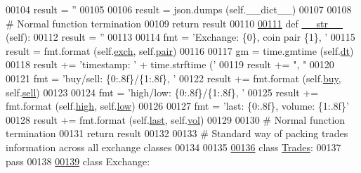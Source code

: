 \begin{DoxyCode}
00104         result = \textcolor{stringliteral}{''}
00105         
00106         result = json.dumps (self.\_\_dict\_\_)       
00107         
00108         \textcolor{comment}{# Normal function termination}
00109         \textcolor{keywordflow}{return} result
00110     
\hypertarget{exchange_8py_source.tex_l00111}{}\hyperlink{classexchange_1_1_ticker_af91836a1c408f54dda95d9865cefba45}{00111}     \textcolor{keyword}{def }\hyperlink{classexchange_1_1_ticker_af91836a1c408f54dda95d9865cefba45}{\_\_str\_\_} (self):
00112         result = \textcolor{stringliteral}{''}
00113         
00114         fmt    = \textcolor{stringliteral}{'Exchange: \{0\}, coin pair \{1\}, '} 
00115         result = fmt.format (self.\hyperlink{classexchange_1_1_ticker_a33f33fe9a12da3ce52938afdc577c061}{exch}, self.\hyperlink{classexchange_1_1_ticker_a382f9199d13a7b5929a26065fad4e491}{pair})
00116         
00117         gm = time.gmtime (self.\hyperlink{classexchange_1_1_ticker_a45e3162d9956cee797f21d93c44c6baf}{dt})
00118         result += \textcolor{stringliteral}{'timestamp: '} + time.strftime (\textcolor{stringliteral}{'%
00119         result += \textcolor{stringliteral}{", "}
00120         
00121         fmt     = \textcolor{stringliteral}{'buy/sell: \{0:.8f\}/\{1:.8f\}, '}
00122         result += fmt.format (self.\hyperlink{classexchange_1_1_ticker_a2ca48c3fa9aba92241392a05bef39324}{buy}, self.\hyperlink{classexchange_1_1_ticker_a5ba9e257d2ed28f02528a37d9ebd793e}{sell})
00123         
00124         fmt     = \textcolor{stringliteral}{'high/low: \{0:.8f\}/\{1:.8f\}, '}
00125         result += fmt.format (self.\hyperlink{classexchange_1_1_ticker_aace381ca15468df6a40e8d86b7710a7f}{high}, self.\hyperlink{classexchange_1_1_ticker_a1c1f26a47a82fc799fcebf158e104405}{low})
00126         
00127         fmt     = \textcolor{stringliteral}{'last: \{0:.8f\}, volume: \{1:.8f\}'}
00128         result += fmt.format (self.\hyperlink{classexchange_1_1_ticker_add7c2d95fa790dcdffddae2e584ce5f5}{last}, self.\hyperlink{classexchange_1_1_ticker_a24c0dd396aebc54c06e429a68c964ea3}{vol})
00129         
00130         \textcolor{comment}{# Normal function termination}
00131         \textcolor{keywordflow}{return} result
00132 
00133 \textcolor{comment}{# Standard way of packing trades information across all exchange classes}
00134         
00135         
\hypertarget{exchange_8py_source.tex_l00136}{}\hyperlink{classexchange_1_1_trades}{00136} \textcolor{keyword}{class }\hyperlink{classexchange_1_1_trades}{Trades}:
00137     \textcolor{keywordflow}{pass}
00138 
\hypertarget{exchange_8py_source.tex_l00139}{}\hyperlink{classexchange_1_1_exchange}{00139} \textcolor{keyword}{class }Exchange:
}
\end{DoxyCode}

